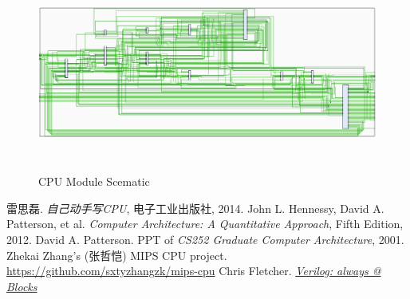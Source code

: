 \documentclass[12pt, a4paper]{article}
\theoremstyle{margin}
\begin{document}
\begin{figure}[H]
	\begin{center}
	  \includegraphics[height=6.5cm]{implementation-circuit-cpu.png}
	\end{center}
	\caption{CPU Module Scematic}
\end{figure}

\begin{thebibliography}{9}
  	雷思磊.
  	\emph{自己动手写CPU},
  	电子工业出版社, 2014.
	John L. Hennessy, David A. Patterson, et al.
	\emph{Computer Architecture: A Quantitative Approach},
	Fifth Edition, 2012.
	David A. Patterson.
	PPT of \emph{CS252 Graduate Computer Architecture},
	2001.
  	Zhekai Zhang's (张哲恺) MIPS CPU project.
  	\url{https://github.com/sxtyzhangzk/mips-cpu}
  	Chris Fletcher.
  	\emph{\href{https://github.com/Evensgn/RISC-V-CPU/blob/dev/doc/Always@.pdf}{Verilog: always @ Blocks}}
  
\end{thebibliography}
\end{document}
